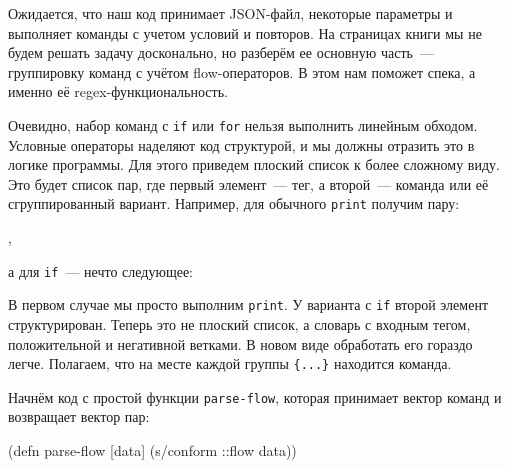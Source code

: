 \begin{english}
  \begin{clojure}
  \end{clojure}
\end{english}

Ожидается, что наш код принимает JSON-файл, некоторые параметры и выполняет
команды с учетом условий и повторов. На страницах книги мы не будем решать
задачу досконально, но разберём ее основную часть~--- группировку команд с
учётом flow-операторов. В этом нам поможет спека, а именно её
regex-функциональность.


Очевидно, набор команд с \texttt{if} или \texttt{for} нельзя выполнить линейным
обходом. Условные операторы наделяют код структурой, и мы должны отразить это в
логике программы. Для этого приведем плоский список к более сложному виду. Это
будет список пар, где первый элемент~--- тег, а второй~--- команда или её
сгруппированный вариант. Например, для обычного \texttt{print} получим пару:

\begin{english}
  \begin{clojure}
,
  \end{clojure}
\end{english}

\noindent
а для \texttt{if}~--- нечто следующее:

\begin{english}
  \begin{clojure}
  \end{clojure}
\end{english}

В первом случае мы просто выполним \verb|print|. У варианта с \verb|if| второй
элемент структурирован. Теперь это не плоский список, а словарь с входным тегом,
положительной и негативной ветками. В новом виде обработать его гораздо
легче. Полагаем, что на месте каждой группы \verb|{...}| находится команда.

Начнём код с простой функции \texttt{parse-flow}, которая принимает вектор
команд и возвращает вектор пар:

\begin{english}
  \begin{clojure}
(defn parse-flow [data]
  (s/conform ::flow data))
  \end{clojure}
\end{english}

